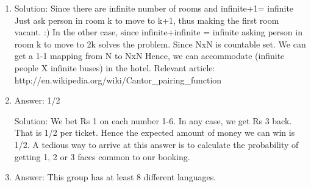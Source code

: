 \begin{enumerate}

\item
Solution: Since there are infinite number of rooms and infinite+1= infinite
Just ask person in room k to move to k+1, thus making the first room vacant. :)
In the other case, since infinite+infinite = infinite
asking person in room k to move to 2k solves the problem.
Since NxN is countable set. We can get a 1-1 mapping from N to NxN
Hence, we can accommodate (infinite people X infinite buses) in the hotel.
Relevant article: 
http://en.wikipedia.org/wiki/Cantor\_pairing\_function




\item
Answer: 1/2
 
Solution: We bet Rs 1 on each number 1-6. In any case, we get Rs 3 back. That is 1/2 per ticket. Hence the expected amount of money we can win is 1/2. A tedious way to arrive at this answer is to calculate the probability of getting 1, 2 or 3 faces common to our booking.




\item
Answer: This group has at least 8 different languages.
 

\end{enumerate}

